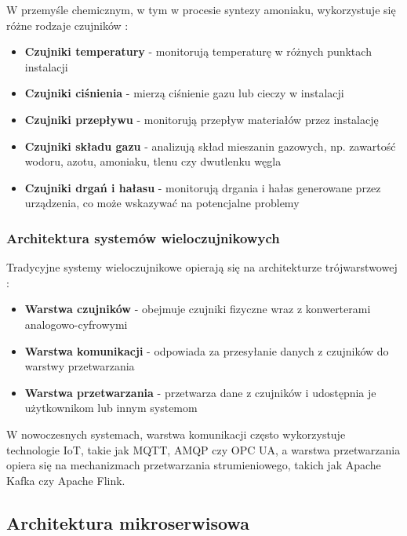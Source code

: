 W przemyśle chemicznym, w tym w procesie syntezy amoniaku, wykorzystuje się różne rodzaje czujników \citep{industrial_sensors}:

\begin{itemize}
    \item \textbf{Czujniki temperatury} - monitorują temperaturę w różnych punktach instalacji
    \item \textbf{Czujniki ciśnienia} - mierzą ciśnienie gazu lub cieczy w instalacji
    \item \textbf{Czujniki przepływu} - monitorują przepływ materiałów przez instalację
    \item \textbf{Czujniki składu gazu} - analizują skład mieszanin gazowych, np. zawartość wodoru, azotu, amoniaku, tlenu czy dwutlenku węgla
    \item \textbf{Czujniki drgań i hałasu} - monitorują drgania i hałas generowane przez urządzenia, co może wskazywać na potencjalne problemy
\end{itemize}

\subsubsection{Architektura systemów wieloczujnikowych}
\label{subsubsec:architektura_systemow}

Tradycyjne systemy wieloczujnikowe opierają się na architekturze trójwarstwowej \citep{multisensor_architecture}:

\begin{itemize}
    \item \textbf{Warstwa czujników} - obejmuje czujniki fizyczne wraz z konwerterami analogowo-cyfrowymi
    \item \textbf{Warstwa komunikacji} - odpowiada za przesyłanie danych z czujników do warstwy przetwarzania
    \item \textbf{Warstwa przetwarzania} - przetwarza dane z czujników i udostępnia je użytkownikom lub innym systemom
\end{itemize}

W nowoczesnych systemach, warstwa komunikacji często wykorzystuje technologie IoT, takie jak MQTT, AMQP czy OPC UA, a warstwa przetwarzania opiera się na mechanizmach przetwarzania strumieniowego, takich jak Apache Kafka czy Apache Flink.

\subsection{Architektura mikroserwisowa}
\label{subsec:architektura_mikroserwisowa}

